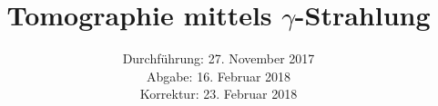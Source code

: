 

\subject{Versuch M14}
\title{Tomographie mittels \texorpdfstring{$\gamma$}{Gamma}-Strahlung}
\date{Durchführung: 27. November 2017 \\
      Abgabe: 16. Februar 2018 \\
      Korrektur: 23. Februar 2018}



\maketitle
\newpage






\nocite{VM14}

\printbibliography


